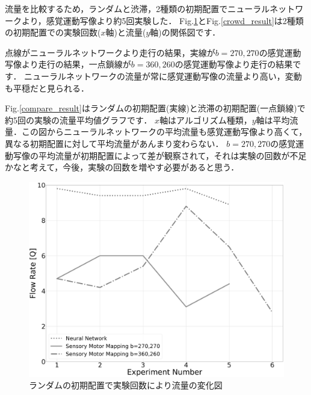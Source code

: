 流量を比較するため，ランダムと渋滞，2種類の初期配置でニューラルネットワークより，感覚運動写像より約5回実験した．
Fig.\ref{random_result}とFig.\ref{crowd_result}は2種類の初期配置での実験回数($x$軸)と流量($y$軸)の関係図です．

点線がニューラルネットワークより走行の結果，実線が$b=270,270$の感覚運動写像より走行の結果，一点鎖線が$b=360,260$の感覚運動写像より走行の結果です．
ニューラルネットワークの流量が常に感覚運動写像の流量より高い，変動も平穏だと見られる．

Fig.\ref{compare_result}はランダムの初期配置(実線)と渋滞の初期配置(一点鎖線)で約5回の実験の流量平均値グラフです．
$x$軸はアルゴリズム種類，$y$軸は平均流量．この図からニューラルネットワークの平均流量も感覚運動写像より高くて，異なる初期配置に対して平均流量があんまり変わらない．
$b=270,270$の感覚運動写像の平均流量が初期配置によって差が観察されて，それは実験の回数が不足かなと考えて，今後，実験の回数を増やす必要があると思う．


\vspace{-1mm}
\begin{figure}[!ht]
    \centering
    \includegraphics[width=0.9\linewidth]{result_diagrim_rand.eps}
    \caption{ランダムの初期配置で実験回数により流量の変化図}
    \label{random_result}
\end{figure}


